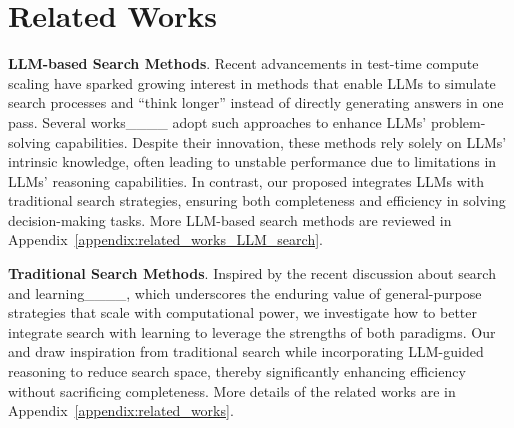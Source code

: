\section{Related Works}
\label{sec:related_works}
\textbf{LLM-based Search Methods}.  
Recent advancements in test-time compute scaling have sparked growing interest in methods that enable LLMs to simulate search processes and ``think longer'' instead of directly generating answers in one pass. Several works____ adopt such approaches to enhance LLMs' problem-solving capabilities. 
Despite their innovation, these methods rely solely on LLMs' intrinsic knowledge, often leading to unstable performance due to limitations in LLMs' reasoning capabilities. In contrast, our proposed \method integrates LLMs with traditional search strategies, ensuring both completeness and efficiency in solving decision-making tasks. More LLM-based search methods are reviewed in Appendix~\ref{appendix:related_works_LLM_search}.

\noindent \textbf{Traditional Search Methods}.  
Inspired by the recent discussion about search and learning____, which underscores the enduring value of general-purpose strategies that scale with computational power, we investigate how to better integrate search with learning to leverage the strengths of both paradigms. Our \method and \cmethod draw inspiration from traditional search while incorporating LLM-guided reasoning to reduce search space, thereby significantly enhancing efficiency without sacrificing completeness. More details of the related works are in Appendix~\ref{appendix:related_works}.